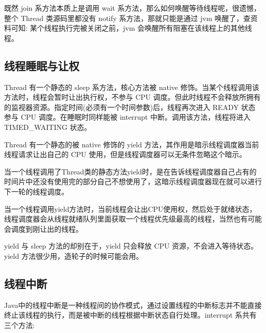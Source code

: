 既然 join 系方法本质上是调用 wait 系方法，那么如何唤醒等待线程呢，很遗憾，整个 Thread 类源码里都没有 notify 系方法，那就只能是通过 jvm 唤醒了，查资料可知: 某个线程执行完被关闭之前，jvm 会唤醒所有阻塞在该线程上的其他线程。

\subsection{线程睡眠与让权}

Thread 有一个静态的 sleep 系方法，核心方法被 native 修饰。当某个线程调用该方法时，线程会暂时让出执行权，不参与 CPU 调度。但此时线程不会释放所拥有的监视器资源。指定时间(必须有一个时间参数)后，线程再次进入 READY 状态参与 CPU 调度。在睡眠时同样能被 interrupt 中断。调用该方法，线程将进入 TIMED\_WAITING 状态。

Thread 有一个静态的被 native 修饰的 yield 方法，其作用是暗示线程调度器当前线程请求让出自己的 CPU 使用，但是线程调度器可以无条件忽略这个暗示。

当一个线程调用了Thread类的静态方法yield时，是在告诉线程调度器自己占有的时间片中还没有使用完的部分自己不想使用了，这暗示线程调度器现在就可以进行下一轮的线程调度。

当一个线程调用yield方法时，当前线程会让出CPU使用权，然后处于就绪状态，线程调度器会从线程就绪队列里面获取一个线程优先级最高的线程，当然也有可能会调度到刚让出的线程。

yield 与 sleep 方法的却别在于，yield 只会释放 CPU 资源，不会进入等待状态。yield 方法很少用，造轮子的时候可能会用。

\subsection{线程中断}

Java中的线程中断是一种线程间的协作模式，通过设置线程的中断标志并不能直接终止该线程的执行，而是被中断的线程根据中断状态自行处理。interrupt 系共有三个方法:

